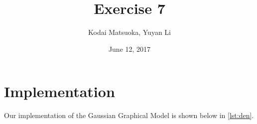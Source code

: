 \documentclass[12pt]{scrartcl}
\author{Kodai Matsuoka, Yuyan Li}
\title{Exercise 7}
\date{June 12, 2017}
\begin{document}
\maketitle

\section{Implementation}

Our implementation of the Gaussian Graphical Model is shown below in \cref{lst:den}.



\clearpage

\end{document}
